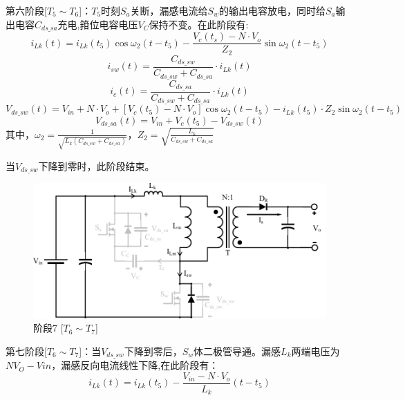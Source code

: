 \documentclass[UTF8]{ctexart}
\numberwithin{equation}{section}
\begin{document}
	第六阶段[$T_5 \sim T_6$]：$T_5$时刻$S_a$关断，漏感电流给$S_w$的输出电容放电，同时给$S_a$输出电容$C_{ds\_sa}$充电,箝位电容电压$V_C$保持不变。在此阶段有:
	\begin{equation}
	i_{Lk}(t)=i_{L k}\left(t_{5}\right) \cos \omega_{2}\left(t-t_{5}\right)-\frac{V_c\left(t_{s}\right)-N \cdot V_o}{Z_{2}} \sin \omega_{2}\left(t-t_{5}\right)
	\end{equation}
	\begin{equation}
	i_{s w}(t)=\frac{C_{d s\_s w}}{C_{d s\_s w}+C_{d s\_s a}} \cdot i_{L k}(t)
	\end{equation}
	\begin{equation}
	i_{c}(t)=\frac{C_{d s\_s a}}{C_{d s\_s w}+C_{d s\_s a}} \cdot i_{L k}(t)
	\end{equation}
	\begin{equation}
	V_{d s\_s w}(t)=V_{i n}+N \cdot V_o+\left[V_c\left(t_{5}\right)-N \cdot V_o\right] \cos \omega_{2}\left(t-t_{5}\right)-i_{L k}\left(t_{5}\right) \cdot Z_{2} \sin \omega_{2}\left(t-t_{5}\right)
	\end{equation}
	\begin{equation}
	V_{d s\_s a}(t)=V_{i n}+V_c\left(t_{5}\right)-V_{d s\_s w}(t)
	\end{equation}
	其中，$\omega_{2}=\frac{1}{\sqrt{L_{k}\left(C_{d s\_s w}+C_{d s\_s a}\right)}}$，$Z_{2}=\sqrt{\frac{L_{k}}{C_{d s\_s w}+C_{d s\_s a}}}$
	
	当$V_{d s\_s w}$下降到零时，此阶段结束。
	
	\begin{figure}[h]
		\centering
		\includegraphics[scale=0.5]{image/mo7.pdf}
		\caption{阶段7 [$T_6 \sim T_7$]}
	\end{figure}
	
	第七阶段[$T_6 \sim T_7$]：当$V_{d s\_s w}$下降到零后，$S_w$体二极管导通。漏感$L_k$两端电压为$NV_O-V{in}$，漏感反向电流线性下降,在此阶段有：
	\begin{equation}
	i_{L k}(t)=i_{L k}\left(t_{5}\right)-\frac{V_{i n}-N \cdot V_o}{L_{k}}\left(t-t_{5}\right)
	\end{equation}
	
\end{document}
